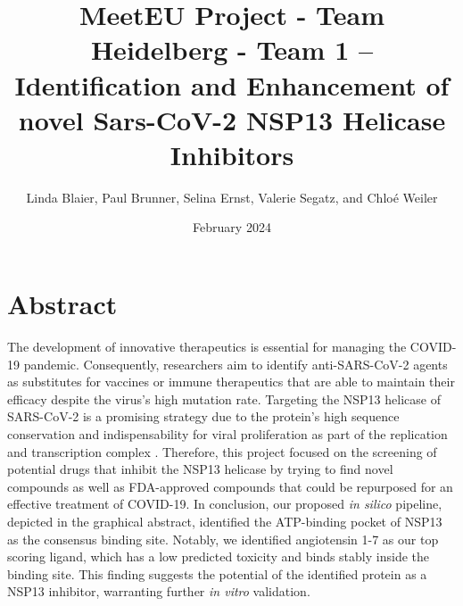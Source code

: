 \documentclass[11pt, letterpaper, titlepage]{article}
\title{MeetEU Project - Team Heidelberg - Team 1 -- \\ Identification and Enhancement of novel Sars-CoV-2 NSP13 Helicase Inhibitors}
\author{Linda Blaier, Paul Brunner, Selina Ernst, Valerie Segatz, and Chlo\'{e} Weiler}
\date{February 2024}
\renewcommand{\cite}{\parencite}
\begin{document}
\maketitle

\ihead{\headmark}
\cfoot{\pagemark}   %



\section{Abstract}

The development of innovative therapeutics is essential for managing the COVID-19 pandemic. Consequently, researchers aim to identify anti-SARS-CoV-2 agents as substitutes for vaccines or immune therapeutics that are able to maintain their efficacy despite the virus's high mutation rate. Targeting the NSP13 helicase of SARS-CoV-2 is a promising strategy due to the protein's high sequence conservation and indispensability for viral proliferation as part of the replication and transcription complex \cite{Marecki,malone2022structures}. Therefore, this project focused on the screening of potential drugs that inhibit the NSP13 helicase by trying to find novel compounds as well as FDA-approved compounds that could be repurposed for an effective treatment of COVID-19. In conclusion, our proposed \textit{in silico} pipeline, depicted in the graphical abstract, identified the ATP-binding pocket of NSP13 as the consensus binding site. Notably, we identified angiotensin 1-7 as our top scoring ligand, which has a low predicted toxicity and binds stably inside the binding site. This finding suggests the potential of the identified protein as a NSP13 inhibitor, warranting further \textit{in vitro} validation.
\FloatBarrier
\end{document}
